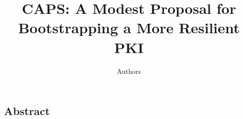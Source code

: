 \documentclass[letterpaper,twocolumn,10pt]{article}
\begin{document}
\date{}

\title{
  CAPS: A Modest Proposal for Bootstrapping a More Resilient PKI
}
\author{
  Authors
}

\maketitle

\thispagestyle{empty}

\subsection*{Abstract}




%

%

%

%

%

%

\footnotesize



\theendnotes
\end{document}

